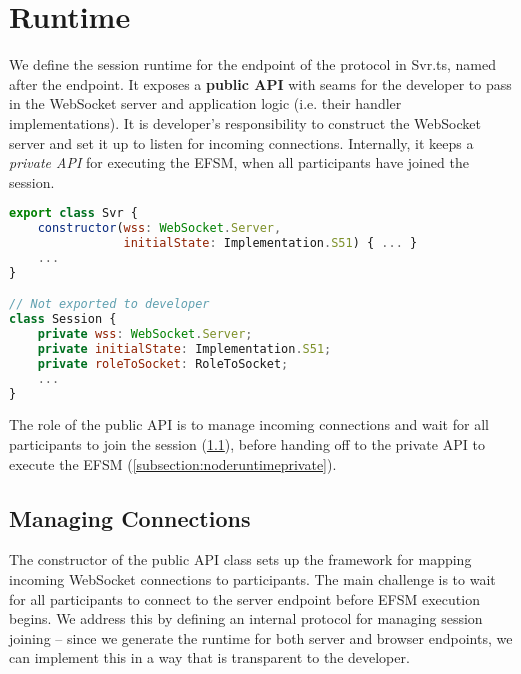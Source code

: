 \section{Runtime}
\label{section:noderuntime}

We define the session runtime for the  endpoint
of the  protocol in Svr.ts,
named after the endpoint.
It exposes a \textbf{public API}
with seams for the developer to pass in the WebSocket server 
and application logic
(i.e. their handler implementations).
It is developer's responsibility to construct the
WebSocket server and set it up to listen for incoming connections.
Internally, it keeps a \textit{private API}
for executing the EFSM, when all participants have 
joined the session.

\begin{lstlisting}[language=javascript]
export class Svr {
	constructor(wss: WebSocket.Server,
				initialState: Implementation.S51) { ... }
	...
}

// Not exported to developer
class Session {
	private wss: WebSocket.Server;
	private initialState: Implementation.S51;
	private roleToSocket: RoleToSocket;
	...
}
\end{lstlisting}

The role of the public API is to manage incoming connections and
wait for all participants to join the session 
(\cref{subsection:noderuntimepublic}), before
handing off to the private API to execute the EFSM
(\cref{subsection:noderuntimeprivate}).

\subsection{Managing Connections}
\label{subsection:noderuntimepublic}

The constructor of the public API class sets up
the framework for mapping incoming WebSocket connections to
participants. 
The main challenge is to wait for all participants to 
connect to the server endpoint before EFSM execution begins.
We address this by defining an internal protocol for managing
session joining -- since we generate the runtime for both server 
and browser endpoints, we can implement this in a way that is 
transparent to the developer.

